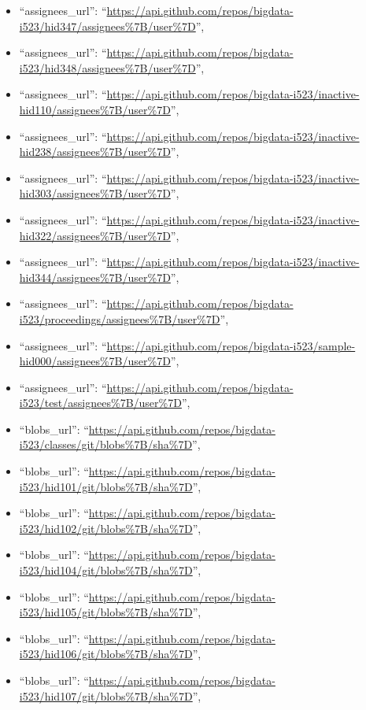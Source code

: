 \begin{itemize}
\item
  ``assignees\_url'':
  ``\url{https://api.github.com/repos/bigdata-i523/hid347/assignees\%7B/user\%7D}'',
\item
  ``assignees\_url'':
  ``\url{https://api.github.com/repos/bigdata-i523/hid348/assignees\%7B/user\%7D}'',
\item
  ``assignees\_url'':
  ``\url{https://api.github.com/repos/bigdata-i523/inactive-hid110/assignees\%7B/user\%7D}'',
\item
  ``assignees\_url'':
  ``\url{https://api.github.com/repos/bigdata-i523/inactive-hid238/assignees\%7B/user\%7D}'',
\item
  ``assignees\_url'':
  ``\url{https://api.github.com/repos/bigdata-i523/inactive-hid303/assignees\%7B/user\%7D}'',
\item
  ``assignees\_url'':
  ``\url{https://api.github.com/repos/bigdata-i523/inactive-hid322/assignees\%7B/user\%7D}'',
\item
  ``assignees\_url'':
  ``\url{https://api.github.com/repos/bigdata-i523/inactive-hid344/assignees\%7B/user\%7D}'',
\item
  ``assignees\_url'':
  ``\url{https://api.github.com/repos/bigdata-i523/proceedings/assignees\%7B/user\%7D}'',
\item
  ``assignees\_url'':
  ``\url{https://api.github.com/repos/bigdata-i523/sample-hid000/assignees\%7B/user\%7D}'',
\item
  ``assignees\_url'':
  ``\url{https://api.github.com/repos/bigdata-i523/test/assignees\%7B/user\%7D}'',
\item
  ``blobs\_url'':
  ``\url{https://api.github.com/repos/bigdata-i523/classes/git/blobs\%7B/sha\%7D}'',
\item
  ``blobs\_url'':
  ``\url{https://api.github.com/repos/bigdata-i523/hid101/git/blobs\%7B/sha\%7D}'',
\item
  ``blobs\_url'':
  ``\url{https://api.github.com/repos/bigdata-i523/hid102/git/blobs\%7B/sha\%7D}'',
\item
  ``blobs\_url'':
  ``\url{https://api.github.com/repos/bigdata-i523/hid104/git/blobs\%7B/sha\%7D}'',
\item
  ``blobs\_url'':
  ``\url{https://api.github.com/repos/bigdata-i523/hid105/git/blobs\%7B/sha\%7D}'',
\item
  ``blobs\_url'':
  ``\url{https://api.github.com/repos/bigdata-i523/hid106/git/blobs\%7B/sha\%7D}'',
\item
  ``blobs\_url'':
  ``\url{https://api.github.com/repos/bigdata-i523/hid107/git/blobs\%7B/sha\%7D}'',

\end{itemize}
